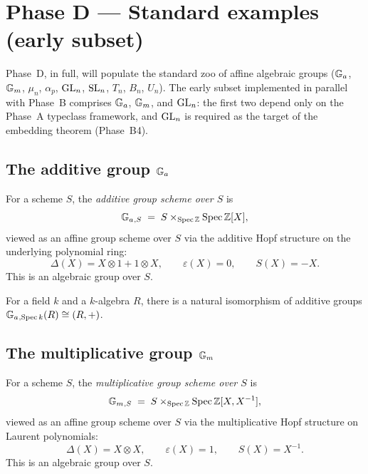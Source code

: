 \chapter{Phase D --- Standard examples (early subset)}

Phase~D, in full, will populate the standard zoo of affine algebraic groups
($\mathbb{G}_a$, $\mathbb{G}_m$, $\mu_n$, $\alpha_p$, $\mathrm{GL}_n$, $\mathrm{SL}_n$, $T_n$, $B_n$, $U_n$).
The early subset implemented in parallel with Phase~B comprises $\mathbb{G}_a$, $\mathbb{G}_m$,
and $\mathrm{GL}_n$: the first two depend only on the Phase~A typeclass framework,
and $\mathrm{GL}_n$ is required as the target of the embedding theorem (Phase~B4).

\section{The additive group $\mathbb{G}_a$}

\begin{definition}\label{def:Ga}
For a scheme $S$, the \emph{additive group scheme over $S$} is
\[
  \mathbb{G}_a{}_{,S} \;=\; S \times_{\operatorname{Spec} \mathbb{Z}} \operatorname{Spec} \mathbb{Z}[X],
\]
viewed as an affine group scheme over $S$ via the additive Hopf structure on
the underlying polynomial ring:
\[
  \Delta(X) = X \otimes 1 + 1 \otimes X, \qquad
  \varepsilon(X) = 0, \qquad
  S(X) = -X.
\]
This is an algebraic group over $S$.
\end{definition}

\begin{lemma}[$\Ga(R) = R$]\label{lem:Ga-points}
For a field $k$ and a $k$-algebra $R$, there is a natural isomorphism of
additive groups $\mathbb{G}_a{}_{,\operatorname{Spec} k}(R) \cong (R, +)$.
\end{lemma}

\section{The multiplicative group $\mathbb{G}_m$}

\begin{definition}\label{def:Gm}
For a scheme $S$, the \emph{multiplicative group scheme over $S$} is
\[
  \mathbb{G}_m{}_{,S} \;=\; S \times_{\operatorname{Spec} \mathbb{Z}} \operatorname{Spec} \mathbb{Z}[X, X^{-1}],
\]
viewed as an affine group scheme over $S$ via the multiplicative Hopf
structure on Laurent polynomials:
\[
  \Delta(X) = X \otimes X, \qquad
  \varepsilon(X) = 1, \qquad
  S(X) = X^{-1}.
\]
This is an algebraic group over $S$.
\end{definition}

